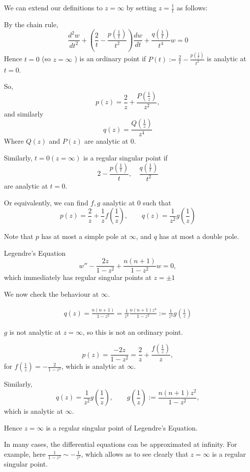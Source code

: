 \documentclass[a4paper]{article}
\begin{document}
We can extend our definitions to $z=\infty$ by setting $z=\frac{1}{t}$ as follows:

By the chain rule,
\[
	\frac{d^2w}{dt^2} + \left( \frac{2}{t} - \frac{p\left( \frac{1}{t} \right) }{t^2} \right) \frac{dw}{dt} + \frac{q\left( \frac{1}{t} \right) }{t^{4}} w =0
\] 
Hence $t=0$ (so $z=\infty$ ) is an ordinary point if $P(t) := \frac{2}{t} - \frac{p\left( \frac{1}{t} \right) }{t^2}$ is analytic at $t=0$.

So,  \[
	p(z) = \frac{2}{z} + \frac{P\left( \frac{1}{z} \right) }{z^2}
,\] and similarly
\[
	q(z) = \frac{Q\left(\frac{1}{z}\right)}{z^{4}}
\] 
Where $Q(z)$ and  $P(z)$ are analytic at $0$.

Similarly,  $ t=0 (z=\infty)$ is a regular singular point if
\[
	2 - \frac{p\left(\frac{1}{t}\right)}{t}, \quad \frac{q\left(\frac{1}{t}\right)}{t^2}
\] are analytic at $t=0$.

Or equivalently, we can find  $f, g$ analytic at $0$ such that
\[
	p(z) = \frac{2}{z} + \frac{1}{z}f\left( \frac{1}{z} \right), \qquad q(z) = \frac{1}{z^2}g\left( \frac{1}{z} \right) 
\] 

Note that $p$ has at most a simple pole at $\infty$, and $q$ has at most a double pole.

\begin{eg} Legendre's Equation
	\[
		w'' - \frac{2z}{1-z^2} + \frac{n(n+1)}{1-z^2} w =0
	,\] which immediately has regular singular points at $z = \pm 1$

	We now check the behaviour at $\infty$.

	\begin{align*}
		q(z) = \frac{n(n+1)}{1-z^2} = \frac{1}{z^{4}} \frac{n(n+1)z^{4}}{1-z^2} := \frac{1}{z^{4}} g(\frac{1}{z})
	\end{align*}

	$g$ is not analytic at $z=\infty$, so this is not an ordinary point.

	\[
		p(z) = \frac{-2z}{1-z^2} = \frac{2}{z} + \frac{f\left( \frac{1}{z} \right) }{z}
	,\] for $f\left( \frac{1}{z} \right) = -\frac{2}{1-z^2}$, which is analytic at $\infty$.

	Similarly,
	\[
		q(z) = \frac{1}{z^2}g\left( \frac{1}{z} \right), \qquad g\left(\frac{1}{z}\right) := \frac{n(n+1)z^2}{1-z^2}
	,\] which is analytic at $\infty$.

	Hence $z=\infty$ is a regular singular point of Legendre's Equation.
\end{eg}

\begin{remark}
	In many cases, the differential equations can be approximated at infinity. For example, here $\frac{1}{1-z^2} \sim -\frac{1}{z^2}$, which allows as to see clearly that $z=\infty$ is a regular singular point.
\end{remark}
\end{document}
